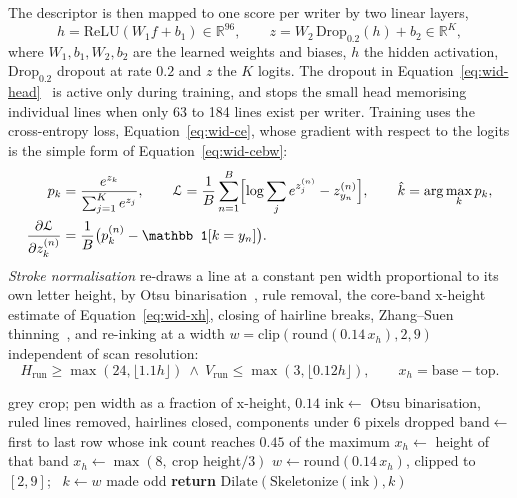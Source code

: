 The descriptor is then mapped to one score per writer by two linear layers,
\begin{equation}
h=\mathrm{ReLU}(W_1f+b_1)\in\mathbb R^{96},\qquad z=W_2\,\mathrm{Drop}_{0.2}(h)+b_2\in\mathbb R^{K},
\label{eq:wid-head}
\end{equation}
where $W_1,b_1,W_2,b_2$ are the learned weights and biases, $h$ the hidden activation, $\mathrm{Drop}_{0.2}$ dropout at rate $0.2$ and $z$ the $K$ logits. The dropout in Equation~\ref{eq:wid-head}~\cite[p.~1930]{srivastava2014} is active only during training, and stops the small head memorising individual lines when only 63 to 184 lines exist per writer. Training uses the cross-entropy loss, Equation~\ref{eq:wid-ce}, whose gradient with respect to the logits is the simple form of Equation~\ref{eq:wid-cebw}:
\begin{align}
p_k&=\frac{e^{z_k}}{\sum_{j=1}^{K}e^{z_j}},\qquad
\mathcal L=\frac1B\sum_{n=1}^B\Bigl[\log\sum_je^{z^{(n)}_j}-z^{(n)}_{y_n}\Bigr],\qquad\hat k=\arg\max_kp_k,\label{eq:wid-ce}\\
\frac{\partial\mathcal L}{\partial z^{(n)}_k}&=\frac{1}{B}\bigl(p^{(n)}_k-\mathbb 1[k=y_n]\bigr).\label{eq:wid-cebw}
\end{align}
\emph{Stroke normalisation} re-draws a line at a constant pen width proportional to its own letter height, by Otsu binarisation~\cite[p.~63]{otsu1979}, rule removal, the core-band x-height estimate of Equation~\ref{eq:wid-xh}, closing of hairline breaks, Zhang--Suen thinning~\cite{zhang1984}, and re-inking at a width $w=\mathrm{clip}(\mathrm{round}(0.14\,x_h),2,9)$ independent of scan resolution:
\begin{equation}
H_{\mathrm{run}}\ge\max(24,\lfloor1.1h\rfloor)\ \wedge\ V_{\mathrm{run}}\le\max(3,\lfloor0.12h\rfloor),\qquad
x_h=\text{base}-\text{top}.
\label{eq:wid-xh}
\end{equation}

\begin{algorithm}[!htbp]
\caption{Stroke normalisation: removing the pen-width cue by construction}
\label{alg:wid-snorm}
\begin{algorithmic}[1]
\REQUIRE grey crop; pen width as a fraction of x-height, $0.14$
\STATE $\mathrm{ink}\leftarrow$ Otsu binarisation, ruled lines removed, hairlines closed, components under 6 pixels dropped
\STATE $\mathrm{band}\leftarrow$ first to last row whose ink count reaches $0.45$ of the maximum 
\STATE $x_h\leftarrow$ height of that band
    \STATE $x_h\leftarrow\max(8,\ \text{crop height}/3)$ 
\ENDIF
\STATE $w\leftarrow\mathrm{round}(0.14\,x_h)$, clipped to $[2,9]$; \ $k\leftarrow w$ made odd
\STATE \textbf{return} $\mathrm{Dilate}(\mathrm{Skeletonize}(\mathrm{ink}),k)$ 
\end{algorithmic}
\end{algorithm}

